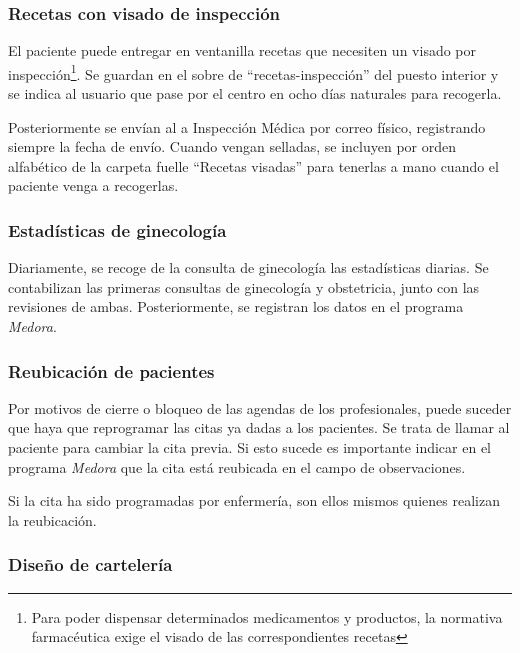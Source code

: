 
\subsubsection{Recetas con visado de inspección}

El paciente puede entregar en ventanilla recetas que necesiten un visado por inspección\footnote{Para poder dispensar determinados medicamentos y productos, la normativa farmacéutica exige el visado de las correspondientes recetas}.
Se guardan en el sobre de ``recetas-inspección'' del puesto interior y se indica al usuario que pase por el centro en ocho días naturales para recogerla.

Posteriormente se envían al a Inspección Médica por correo físico, registrando siempre la fecha de envío.
Cuando vengan selladas, se incluyen por orden alfabético de la carpeta fuelle ``Recetas visadas'' para tenerlas a mano cuando el paciente venga a recogerlas.

\subsubsection{Estadísticas de ginecología}

Diariamente, se recoge de la consulta de ginecología las estadísticas diarias.
Se contabilizan las primeras consultas de ginecología y obstetricia, junto con las revisiones de ambas.
Posteriormente, se registran los datos en el programa \textit{Medora}.

\subsubsection{Reubicación de pacientes}

Por motivos de cierre o bloqueo de las agendas de los profesionales, puede suceder que haya que reprogramar las citas ya dadas a los pacientes.
Se trata de llamar al paciente para cambiar la cita previa. Si esto sucede es importante indicar en el programa \textit{Medora} que la cita está reubicada en el campo de observaciones.

Si la cita ha sido programadas por enfermería, son ellos mismos quienes realizan la reubicación.

\subsubsection{Diseño de cartelería}

